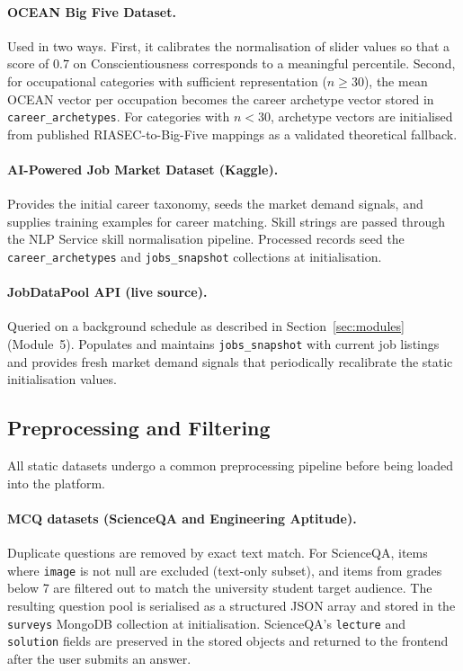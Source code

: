 \paragraph{OCEAN Big Five Dataset.}
Used in two ways. First, it calibrates the normalisation of slider values so
that a score of $0.7$ on Conscientiousness corresponds to a meaningful
percentile. Second, for occupational categories with sufficient representation
($n \geq 30$), the mean OCEAN vector per occupation becomes the career
archetype vector stored in \texttt{career\_archetypes}. For categories with
$n < 30$, archetype vectors are initialised from published RIASEC-to-Big-Five
mappings as a validated theoretical fallback.

\paragraph{AI-Powered Job Market Dataset (Kaggle).}
Provides the initial career taxonomy, seeds the market demand signals, and
supplies training examples for career matching. Skill strings are passed
through the NLP Service skill normalisation pipeline. Processed records seed
the \texttt{career\_archetypes} and \texttt{jobs\_snapshot} collections at
initialisation.

\paragraph{JobDataPool API (live source).}
Queried on a background schedule as described in Section~\ref{sec:modules}
(Module~5). Populates and maintains \texttt{jobs\_snapshot} with current job
listings and provides fresh market demand signals that periodically recalibrate
the static initialisation values.

\subsection{Preprocessing and Filtering}

All static datasets undergo a common preprocessing pipeline before being loaded
into the platform.

\paragraph{MCQ datasets (ScienceQA and Engineering Aptitude).}
Duplicate questions are removed by exact text match. For ScienceQA, items
where \texttt{image} is not null are excluded (text-only subset), and items
from grades below 7 are filtered out to match the university student target
audience. The resulting question pool is serialised as a structured JSON array
and stored in the \texttt{surveys} MongoDB collection at initialisation.
ScienceQA's \texttt{lecture} and \texttt{solution} fields are preserved in the
stored objects and returned to the frontend after the user submits an answer.

